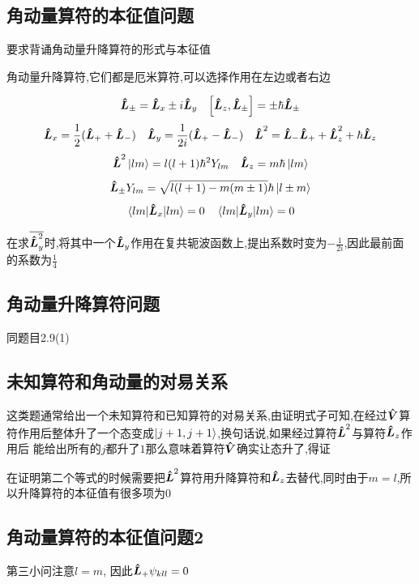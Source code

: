 \documentclass{article}
\begin{document}
        \subsection{角动量算符的本征值问题}
            要求背诵角动量升降算符的形式与本征值
            \begin{formal}
                角动量升降算符,它们都是厄米算符,可以选择作用在左边或者右边

                $$ \vu*{L}_{\pm} = \vu*{L}_{x} \pm  i \vu*{L}_{y} \quad \comm{\vu*{L}_{z}}{\vu*{{L}}_{\pm}} = \pm \hbar \vu*{L}_{\pm} $$
                $$ \vu*{L}_{x}  = \frac{1}{2} (\vu*{L}_{+} + \vu*{L}_{-}) \quad \vu*{L}_{y} = \frac{1}{2i} (\vu*{L}_{+} - \vu*{L}_{-}) \quad \vu*{L}^{2} = \vu*{L}_{-} \vu*{L}_{+} + \vu*{L}_{z}^{2} + \hbar \vu*{L}_{z} $$
                $$ \vu*{L}^{2} \ket{lm} = l(l+1)\hbar^{2} Y_{lm} \quad \vu*{L}_{z} = m\hbar \ket{lm}$$
                $$ \vu*{L}_{\pm} Y_{lm} = \sqrt{l(l+1) - m(m \pm 1)}  \hbar \ket{l \pm m} $$
                $$ \ev{\vu*{L}_{x}}{lm} = 0 \quad \ev{\vu*{L}_{y}}{lm} = 0  $$
            \end{formal}

            在求$ \overline{\vu*{L}_{y}^{2}} $时,将其中一个$\vu*{L}_{y}$作用在复共轭波函数上,提出系数时变为$- \frac{1}{2i}$,因此最前面的系数为$\frac{1}{4}$
        
        \subsection{角动量升降算符问题}
            同题目2.9(1)
        
        \subsection{未知算符和角动量的对易关系}
            这类题通常给出一个未知算符和已知算符的对易关系,由证明式子可知,在经过$\vu*{V}$算符作用后整体升了一个态变成$\ket{j+1 ,j+1}$,换句话说,如果经过算符$\vu*{L}^{2}$与算符$\vu*{L}_{z}$作用后
            能给出所有的$j$都升了$1$那么意味着算符$\vu*{V}$确实让态升了,得证

            在证明第二个等式的时候需要把$\vu*{L}^{2}$算符用升降算符和$\vu*{L}_{z}$去替代,同时由于$m=l$,所以升降算符的本征值有很多项为0
        
        \subsection{角动量算符的本征值问题2}
            第三小问注意$ l = m $, 因此$\vu*{L}_{+} \psi_{kll} = 0 $
\end{document}

